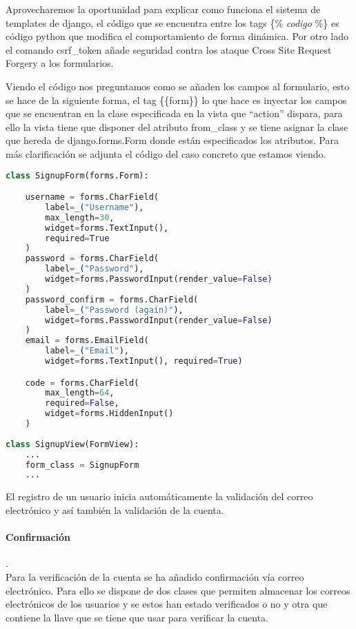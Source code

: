 Aprovecharemos la oportunidad para explicar como funciona el sistema de templates de django, el código que se encuentra entre los tags \{\% \textit{codigo} \%\} es código python que modifica el comportamiento de forma dinámica. Por otro lado el comando csrf\_token añade seguridad  contra los ataque Cross Site Request Forgery a los formularios.

Viendo el código nos preguntamos como se añaden los campos al formulario, esto se hace de la siguiente forma, el tag \{\{form\}\} lo que hace es inyectar los campos que se encuentran en la clase especificada en la vista que ``action'' dispara, para ello la vista tiene que disponer del atributo from\_class y se tiene asignar la clase que hereda de django.forms.Form donde están especificados los atributos. Para más clarificación  se adjunta el código del caso concreto que estamos viendo.

\begin{lstlisting}[language=python]
class SignupForm(forms.Form):

    username = forms.CharField(
        label=_("Username"),
        max_length=30,
        widget=forms.TextInput(),
        required=True
    )
    password = forms.CharField(
        label=_("Password"),
        widget=forms.PasswordInput(render_value=False)
    )
    password_confirm = forms.CharField(
        label=_("Password (again)"),
        widget=forms.PasswordInput(render_value=False)
    )
    email = forms.EmailField(
        label=_("Email"),
        widget=forms.TextInput(), required=True)

    code = forms.CharField(
        max_length=64,
        required=False,
        widget=forms.HiddenInput()
    )
    
class SignupView(FormView):
	...
    form_class = SignupForm
    ...
\end{lstlisting}

El registro de un usuario inicia automáticamente la validación del correo electrónico y así también la validación de la cuenta.
\paragraph{Confirmación}.\\
Para la verificación de la cuenta se ha añadido confirmación vía correo electrónico. 
Para ello se dispone de dos clases que permiten almacenar los correos electrónicos de los usuarios y se estos han estado verificados o no y otra que contiene la llave que se tiene que usar para verificar la cuenta.

